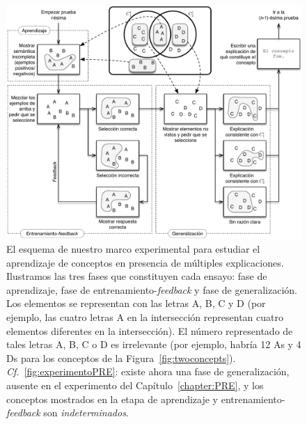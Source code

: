 \begin{figure}[t]
\begin{center}
	\includegraphics[scale=.7]{../figuras/brm/experimentscheme2_sp.pdf}
\end{center}\caption{
El esquema de nuestro marco experimental para estudiar el aprendizaje de conceptos en presencia de múltiples explicaciones. Ilustramos las tres fases que constituyen cada ensayo: fase de aprendizaje, fase de entrenamiento-{\em feedback} y fase de generalización. Los elementos se representan con las letras {\sf A}, {\sf B}, {\sf C} y {\sf D} (por ejemplo, las cuatro letras {\sf A} en la intersección representan cuatro elementos diferentes en la intersección). El número representado de tales letras {\sf A}, {\sf B}, {\sf C} o {\sf D} es irrelevante (por ejemplo, habría 12 {\sf A}s y 4 {\sf D}s para los conceptos de la Figura~\ref{fig:twoconcepts}).
{\em Cf.}~\ref{fig:experimentoPRE}: existe ahora una fase de generalización, ausente en el experimento del Capítulo~\ref{chapter:PRE}, y los conceptos mostrados en la etapa de aprendizaje y entrenamiento-{\em feedback} son {\em indeterminados}.}
\label{fig:trials}
\end{figure}

